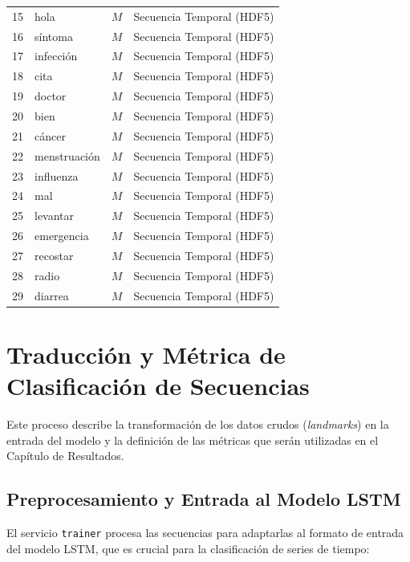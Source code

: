 \begin{table}[H]
\begin{tabular}{|c|l|c|c|}
        15 & hola & $M$ & Secuencia Temporal (HDF5) \\
        16 & síntoma & $M$ & Secuencia Temporal (HDF5) \\
        17 & infección & $M$ & Secuencia Temporal (HDF5) \\
        18 & cita & $M$ & Secuencia Temporal (HDF5) \\
        19 & doctor & $M$ & Secuencia Temporal (HDF5) \\
        20 & bien & $M$ & Secuencia Temporal (HDF5) \\
        21 & cáncer & $M$ & Secuencia Temporal (HDF5) \\
        22 & menstruación & $M$ & Secuencia Temporal (HDF5) \\
        23 & influenza & $M$ & Secuencia Temporal (HDF5) \\
        24 & mal & $M$ & Secuencia Temporal (HDF5) \\
        25 & levantar & $M$ & Secuencia Temporal (HDF5) \\
        26 & emergencia & $M$ & Secuencia Temporal (HDF5) \\
        27 & recostar & $M$ & Secuencia Temporal (HDF5) \\
        28 & radio & $M$ & Secuencia Temporal (HDF5) \\
        29 & diarrea & $M$ & Secuencia Temporal (HDF5) \\
        \hline
    \end{tabular}
\end{table}


\section{Traducción y Métrica de Clasificación de Secuencias}

Este proceso describe la transformación de los datos crudos (\textit{landmarks}) en la entrada del modelo y la definición de las métricas que serán utilizadas en el Capítulo de Resultados.

\subsection{Preprocesamiento y Entrada al Modelo LSTM}

El servicio \texttt{trainer} procesa las secuencias para adaptarlas al formato de entrada del modelo LSTM, que es crucial para la clasificación de series de tiempo:

